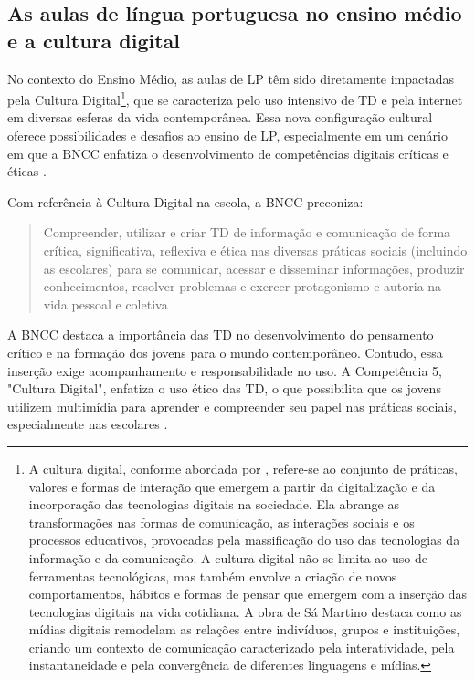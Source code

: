 \documentclass[portuguese]{textolivre}
\begin{document}
\subsection{As aulas de língua portuguesa no ensino médio e a cultura digital}\label{sec-conduta}
No contexto do Ensino Médio, as aulas de LP têm sido diretamente impactadas pela Cultura Digital\footnote{A cultura digital, conforme abordada por \textcite{martino2014}, refere-se ao conjunto de práticas, valores e formas de interação que emergem a partir da digitalização e da incorporação das tecnologias digitais na sociedade. Ela abrange as transformações nas formas de comunicação, as interações sociais e os processos educativos, provocadas pela massificação do uso das tecnologias da informação e da comunicação. A cultura digital não se limita ao uso de ferramentas tecnológicas, mas também envolve a criação de novos comportamentos, hábitos e formas de pensar que emergem com a inserção das tecnologias digitais na vida cotidiana. A obra de Sá Martino destaca como as mídias digitais remodelam as relações entre indivíduos, grupos e instituições, criando um contexto de comunicação caracterizado pela interatividade, pela instantaneidade e pela convergência de diferentes linguagens e mídias.}, que se caracteriza pelo uso intensivo de TD e pela internet em diversas esferas da vida contemporânea. Essa nova configuração cultural oferece possibilidades e desafios ao ensino de LP, especialmente em um cenário em que a BNCC enfatiza o desenvolvimento de competências digitais críticas e éticas \cite{brasil2018}.

Com referência à Cultura Digital na escola, a BNCC preconiza:

\begin{quote}
    Compreender, utilizar e criar TD de informação e comunicação de forma crítica, significativa, reflexiva e ética nas diversas práticas sociais (incluindo as escolares) para se comunicar, acessar e disseminar informações, produzir conhecimentos, resolver problemas e exercer protagonismo e autoria na vida pessoal e coletiva \cite[p. 67]{brasil2018}.
\end{quote}

A BNCC destaca a importância das TD no desenvolvimento do pensamento crítico e na formação dos jovens para o mundo contemporâneo. Contudo, essa inserção exige acompanhamento e responsabilidade no uso. A Competência 5, "Cultura Digital", enfatiza o uso ético das TD, o que possibilita que os jovens utilizem multimídia para aprender e compreender seu papel nas práticas sociais, especialmente nas escolares \cite{brasil2018}.
\end{document}
